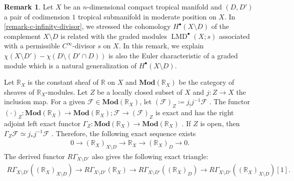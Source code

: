 \documentclass[a4paper,dvipdfmx,reqno,12pt]{amsart}
\theoremstyle{definition}
\newtheorem{remark}[theorem]{Remark}
\newcommand{\deq}{\coloneqq}
\newcommand{\opn}[1]{\operatorname{#1}}
\newcommand{\catn}[1]{\mathbf{#1}}
\numberwithin{equation}{section}
\begin{document}
\begin{remark}
Let $X$ be an $n$-dimensional compact tropical manifold
and $(D,D')$ a pair of
codimension $1$ tropical submanifold in moderate position
on $X$.
In \cref{remark-c-infinity-divisor},
we stressed
the cohomology $H^{\bullet}(X\setminus D)$ of
the complement $X\setminus D$ is related with
the graded modules $\opn{LMD}^{\bullet}(X;s)$
associated with a permissible
$C^{\infty}$-divisor $s$ on $X$.
In this remark, we explain
$\chi(X\setminus D')-\chi(D\setminus (D'\cap D))$
is also the Euler characteristic of a graded module
which is a natural generalization of 
$H^{\bullet}(X\setminus D)$.

Let $\mathbb{R}_X$ is the constant sheaf of $\mathbb{R}$
on $X$ and 
$\catn{Mod}(\mathbb{R}_X)$ be the category of sheaves of 
$\mathbb{R}_X$-modules.
Let $Z$ be a locally closed subset of $X$ and
$j\colon Z\to X$ the inclusion map.
For a given $\mathcal{F}\in \catn{Mod}(\mathbb{R}_X)$,
let $(\mathcal{F})_{Z}\deq j_!j^{-1}\mathcal{F}$ 
\cite[Proposition 2.3.6]{MR1299726}.
The functor
$(\cdot)_{Z}\colon \catn{Mod}(\mathbb{R}_X) \to
\catn{Mod}(\mathbb{R}_X);
\mathcal{F}\to (\mathcal{F})_Z$ is exact and has
the right adjoint left exact functor 
$\Gamma_{Z}\colon \catn{Mod}(\mathbb{R}_X) \to
\catn{Mod}(\mathbb{R}_X)$
\cite[Definition 2.3.8]{MR1299726}.
If $Z$ is open, then
$\Gamma_{Z}\mathcal{F}\simeq
j_*j^{-1}\mathcal{F}$
\cite[Proposition 2.3.9 (iii)]{MR1299726}.
Therefore, the following exact sequence exists
\begin{align}
\label{equation-closed-open-exact}
0 \to (\mathbb{R}_X)_{X\setminus D}
\to \mathbb{R}_X \to (\mathbb{R}_X)_{D} \to 0.
\end{align}
The derived functor $R\Gamma_{X\setminus D'}$ also gives
the following exact triangle:
\begin{align}
R\Gamma_{X\setminus D'}((\mathbb{R}_X)_{X\setminus D})
\to  R\Gamma_{X\setminus D'}(\mathbb{R}_X)
\to R\Gamma_{X\setminus D'}((\mathbb{R}_X)_D)
\to R\Gamma_{X\setminus D'}((\mathbb{R}_X)_{X\setminus D})[1].
\end{align}



\end{remark}
\end{document}
